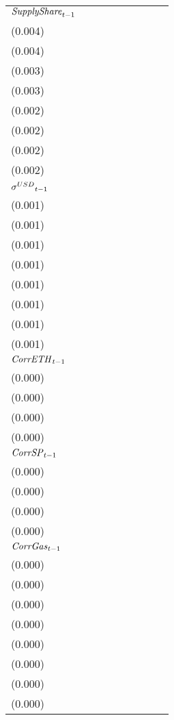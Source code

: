 \begin{tabular}{lllllllll}
${{\it SupplyShare}}_{t-1}$  &   \makecell{$0.036^{***}$ \\(0.004)} &   \makecell{$0.036^{***}$ \\(0.004)} &  \makecell{$-0.014^{***}$ \\(0.003)} &  \makecell{$-0.013^{***}$ \\(0.003)} &   \makecell{$-0.004^{*}$ \\(0.002)} &   \makecell{$-0.004^{*}$ \\(0.002)} &  \makecell{$0.017^{***}$ \\(0.002)} &  \makecell{$0.017^{***}$ \\(0.002)} \\
${{\it \sigma}^{USD}}_{t-1}$ &   \makecell{$0.005^{***}$ \\(0.001)} &   \makecell{$0.004^{***}$ \\(0.001)} &      \makecell{$0.001^{}$ \\(0.001)} &      \makecell{$0.001^{}$ \\(0.001)} &     \makecell{$0.000^{}$ \\(0.001)} &     \makecell{$0.000^{}$ \\(0.001)} &   \makecell{$0.001^{**}$ \\(0.001)} &   \makecell{$0.001^{**}$ \\(0.001)} \\
${{\it CorrETH}}_{t-1}$      &    \makecell{$0.001^{**}$ \\(0.000)} &                                      &    \makecell{$0.001^{**}$ \\(0.000)} &                                      &     \makecell{$0.000^{}$ \\(0.000)} &                                     &    \makecell{$-0.000^{}$ \\(0.000)} &                                     \\
${{\it CorrSP}}_{t-1}$       &                                      &     \makecell{$-0.000^{}$ \\(0.000)} &                                      &      \makecell{$0.000^{}$ \\(0.000)} &                                     &     \makecell{$0.000^{}$ \\(0.000)} &                                     &    \makecell{$-0.000^{}$ \\(0.000)} \\
${{\it CorrGas}}_{t-1}$      &   \makecell{$0.001^{***}$ \\(0.000)} &    \makecell{$0.001^{**}$ \\(0.000)} &      \makecell{$0.000^{}$ \\(0.000)} &      \makecell{$0.000^{}$ \\(0.000)} &     \makecell{$0.000^{}$ \\(0.000)} &     \makecell{$0.000^{}$ \\(0.000)} &  \makecell{$0.001^{***}$ \\(0.000)} &  \makecell{$0.001^{***}$ \\(0.000)} \\

\end{tabular}
